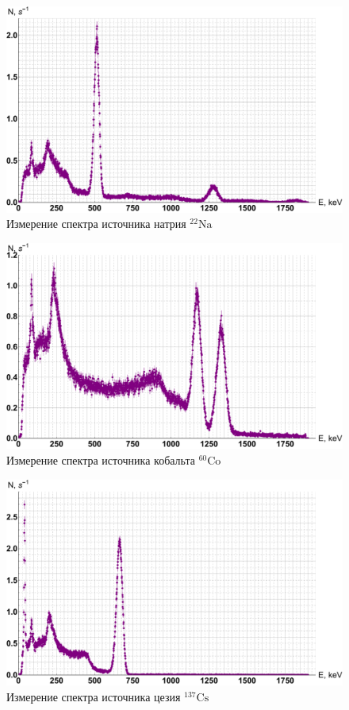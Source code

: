 \documentclass[12pt]{kiarticle}
\begin{document}
	\begin{figure}[H]
		\label{graf_na}
		\includegraphics[scale=0.5]{na.pdf}
		\caption{Измерение спектра источника натрия $ \mathrm{^{22}Na} $}
	\end{figure} 

\begin{figure}[H]
	\label{graf_co}
	\includegraphics[scale=0.5]{co.pdf}
	\caption{Измерение спектра источника кобальта $ \mathrm{^{60}Co} $}
\end{figure} 

	\begin{figure}[H]
	\label{graf_cs}
	\includegraphics[scale=0.5]{cs.pdf}
	\caption{Измерение спектра источника цезия $ \mathrm{^{137}Cs} $}
\end{figure} 
\end{document}
